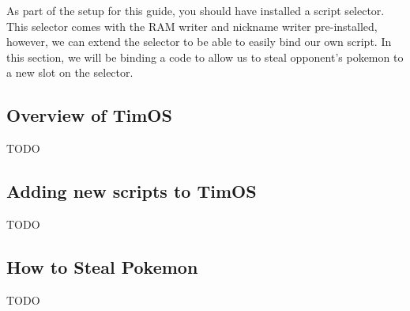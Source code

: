 \documentclass[../main.tex]{subfile}
\begin{document}
    As part of the setup for this guide, you should have installed a script selector.  This selector comes with the RAM writer and nickname writer pre-installed, however, we can extend the selector to be able to easily bind our own script.  In this section, we will be binding a code to allow us to steal opponent's pokemon to a new slot on the selector.

    \subsection{Overview of TimOS}
    TODO

    \subsection{Adding new scripts to TimOS}
    TODO

    \subsection{How to Steal Pokemon}
    TODO
\end{document}
